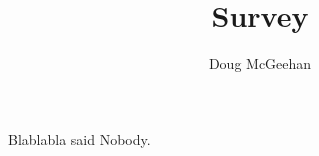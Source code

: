\documentclass[11pt]{article}
\begin{document}
\title{Survey}
\author{Doug McGeehan}

\maketitle

Blablabla said Nobody\cite{gatmir-motahari_time-clustering-based_2013}\cite{gonzalez_understanding_2008}\cite{deville_dynamic_2014}\cite{song_limits_2010}\cite{schneider_unravelling_2013}\cite{perkins_theory_2014}\cite{lu_approaching_2013}\cite{leontiadis_cells_2014}\cite{pirozmand_human_2014}\cite{zhang_user_2014}\cite{isaacman_human_2012}\cite{zhang_nextcell:_2013}\cite{motahari_impact_2012}\cite{ranjan_are_2012}\cite{chon_evaluating_2012}\cite{mcinerney_improving_2012}\cite{do_contextual_2012}\cite{song_evaluating_2006}\cite{de_domenico_interdependence_2013}\cite{do_where_2014}\cite{karamshuk_spot:_2014}\cite{lin_towards_2013}\cite{zhang_exploring_2014}\cite{cho_friendship_2011}\cite{lichman_modeling_2014}\cite{smith_refined_2014}\cite{treurniet_taxonomy_2014}.

%



\end{document}
